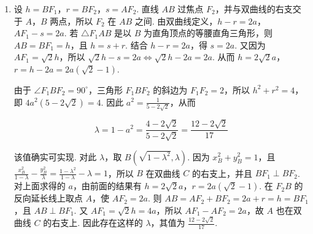 \begin{problem}
\begin{solution}
\begin{enumerate}
因此 \(d_1d_2\sin^2\theta=1-a^2=\lambda\)，所以该双曲线上的点均满足题设条件，方程确实给出了完整轨迹.

\item 设 \(h=BF_1\)，\(r=BF_2\)，\(s=AF_2\). 直线 \(AB\) 过焦点 \(F_2\)，并与双曲线的右支交于 \(A\)，\(B\) 两点，所以 \(F_2\) 在 \(AB\) 之间. 由双曲线定义，\(h-r=2a\)，\(AF_1-s=2a\). 若 \(\triangle F_1AB\) 是以 \(B\) 为直角顶点的等腰直角三角形，则 \(AB=BF_1=h\)，且 \(h=s+r\). 结合 \(h-r=2a\)，得 \(s=2a\). 又因为 \(AF_1=\sqrt{2}h\)，所以 \(\sqrt{2}h-s=2a\Longleftrightarrow\sqrt{2}h-2a=2a\). 从而 \(h=2\sqrt{2}a\)，\(r=h-2a=2a(\sqrt{2}-1)\).

由于 \(\angle F_1BF_2=90^{\circ}\)，三角形 \(F_1BF_2\) 的斜边为 \(F_1F_2=2\)，所以 \(h^2+r^2=4\)，即 \(4a^2(5-2\sqrt{2})=4\). 因此 \(a^2=\frac{1}{5-2\sqrt{2}}\)，从而

\[
\lambda=1-a^2=\frac{4-2\sqrt{2}}{5-2\sqrt{2}}=\frac{12-2\sqrt{2}}{17}
\]

该值确实可实现. 对此 \(\lambda\)，取 \(B\left(\sqrt{1-\lambda^2},\lambda\right)\). 因为 \(x_B^2+y_B^2=1\)，且 \(\frac{x_B^2}{1-\lambda}-\frac{y_B^2}{\lambda}=\frac{1-\lambda^2}{1-\lambda}-\lambda=1\)，所以 \(B\) 在双曲线 \(C\) 的右支上，并且 \(BF_1\perp BF_2\). 对上面求得的 \(a\)，由前面的结果有 \(h=2\sqrt{2}a\)，\(r=2a(\sqrt{2}-1)\). 在 \(F_2B\) 的反向延长线上取点 \(A\)，使 \(AF_2=2a\). 则 \(AB=AF_2+BF_2=2a+r=h=BF_1\)，且 \(AB\perp BF_1\). 又 \(AF_1=\sqrt{2}h=4a\)，所以 \(AF_1-AF_2=2a\)，故 \(A\) 也在双曲线 \(C\) 的右支上. 因此存在这样的 \(\lambda\)，其值为 \(\frac{12-2\sqrt{2}}{17}\).
\end{enumerate}
\end{solution}
\end{problem}
